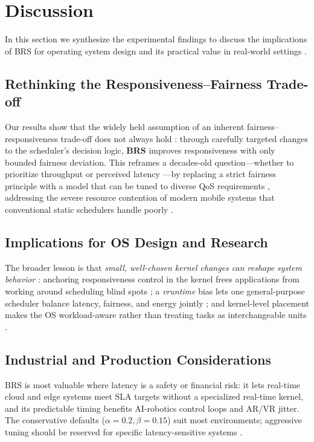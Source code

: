 \section{Discussion}
\label{sec:discussion}

In this section we synthesize the experimental findings to discuss the implications of BRS for operating system design and its practical value in real-world settings \cite{Bouron2018Battle,10306992,6365626}.

\subsection{Rethinking the Responsiveness--Fairness Trade-off}
Our results show that the widely held assumption of an inherent fairness--responsiveness trade-off does not always hold \cite{10306992,4663063,8360522}: through carefully targeted changes to the scheduler's decision logic, \textbf{BRS} improves responsiveness with only bounded fairness deviation. This reframes a decades-old question---whether to prioritize throughput or perceived latency \cite{Bouron2018Battle,241774,8149743}---by replacing a strict fairness principle with a model that can be tuned to diverse QoS requirements \cite{5580094,5169938,8338088}, addressing the severe resource contention of modern mobile systems that conventional static schedulers handle poorly \cite{9121657}.

\subsection{Implications for OS Design and Research}
The broader lesson is that \emph{small, well-chosen kernel changes can reshape system behavior} \cite{Bouron2018Battle,6365626,4663063}: anchoring responsiveness control in the kernel frees applications from working around scheduling blind spots \cite{10306992,917709,6919315}; a \textit{vruntime} bias lets one general-purpose scheduler balance latency, fairness, and energy jointly \cite{8360522,9979771,1244943}; and kernel-level placement makes the OS workload-aware rather than treating tasks as interchangeable units \cite{6919315,1336761}.

\subsection{Industrial and Production Considerations}
BRS is most valuable where latency is a safety or financial risk: it lets real-time cloud and edge systems meet SLA targets without a specialized real-time kernel, and its predictable timing benefits AI-robotics control loops and AR/VR jitter. The conservative defaults ($\alpha{=}0.2,\beta{=}0.15$) suit most environments; aggressive tuning should be reserved for specific latency-sensitive systems \cite{10306992,7426385,5580094}.


